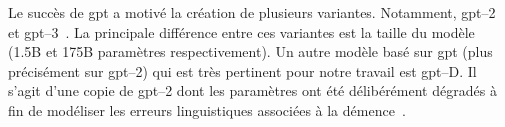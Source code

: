 Le succès de \gls{gpt} a motivé la création de plusieurs variantes.
Notamment, \gls{gpt}--2~\cite{Radford_Wu_Child_Luan_Amodei_Sutskever_2019} 
et \gls{gpt}--3~\cite{Brown_Mann_Ryder_Subbiah_Kaplan_Dhariwal_Neelakantan_Shyam_Sastry_Askell_etal._2020}.
La principale différence entre ces variantes est la taille du modèle (1.5B et 175B paramètres respectivement).
Un autre modèle basé sur \gls{gpt} (plus précisément sur \gls{gpt}--2) 
qui est très pertinent pour notre travail est \gls{gpt}--D.
Il s'agit d'une copie de \gls{gpt}--2 dont les paramètres ont été délibérément dégradés
à fin de modéliser les erreurs linguistiques associées à la démence~\cite{Li_Knopman_Xu_Cohen_Pakhomov_2022}.